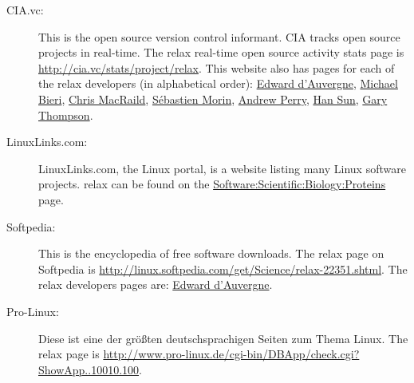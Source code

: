 \begin{description}
\item[CIA.vc:]  This is the open source version control informant.  CIA tracks open source projects in real-time.  The relax real-time open source activity stats page is \href{http://cia.vc/stats/project/relax}{http://cia.vc/stats/project/relax}.  This website also has pages for each of the relax developers (in alphabetical order):  \href{http://cia.vc/stats/author/bugman}{Edward d'Auvergne}, \href{http://cia.vc/stats/author/michaelbieri}{Michael Bieri}, \href{http://cia.vc/stats/author/macraild}{Chris MacRaild}, \href{http://cia.vc/stats/author/semor}{S\'ebastien Morin}, \href{http://cia.vc/stats/author/pansapiens}{Andrew Perry}, \href{http://cia.vc/stats/author/han87}{Han Sun}, \href{http://cia.vc/stats/author/varioustoxins}{Gary Thompson}.
\item[LinuxLinks.com:]  LinuxLinks.com, the Linux portal, is a website listing many Linux software projects.  relax can be found on the \href{http://linuxlinks.com/Software/Scientific/Biology/Proteins/}{Software:\-Scientific:\-Biology:\-Proteins} page.
\item[Softpedia:]  This is the encyclopedia of free software downloads.  The relax page on Softpedia is \href{http://linux.softpedia.com/get/Science/relax-22351.shtml}{http://linux.softpedia.com/get/Science/relax-22351.shtml}.  The relax developers pages are:  \href{http://linux.softpedia.com/developer/Edward-d-039-Auvergne-5136.html}{Edward d'Auvergne}.
\item[Pro-Linux:]  Diese ist eine der gr\"o{\ss}ten deutschsprachigen Seiten zum Thema Linux.  The relax page is \href{http://www.pro-linux.de/cgi-bin/DBApp/check.cgi?ShowApp..10010.100}{http://\-www.\-pro\--linux.\-de/\-cgi\--bin/\-DB\-App/\-check\-.cgi\-?ShowApp..10010.100}.
\end{description}

